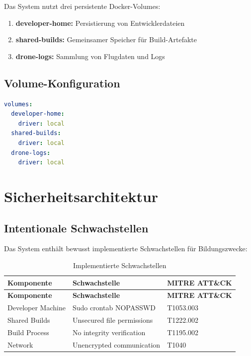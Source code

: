\documentclass[11pt,a4paper]{article}
\begin{document}
Das System nutzt drei persistente Docker-Volumes:

\begin{enumerate}
    \item \textbf{developer-home:} Persistierung von Entwicklerdateien
    \item \textbf{shared-builds:} Gemeinsamer Speicher für Build-Artefakte
    \item \textbf{drone-logs:} Sammlung von Flugdaten und Logs
\end{enumerate}

\subsection{Volume-Konfiguration}

\begin{lstlisting}[language=yaml, caption=Docker Compose Volume-Definition]
volumes:
  developer-home:
    driver: local
  shared-builds:
    driver: local
  drone-logs:
    driver: local
\end{lstlisting}

\section{Sicherheitsarchitektur}

\subsection{Intentionale Schwachstellen}

Das System enthält bewusst implementierte Schwachstellen für Bildungszwecke:

\begin{longtable}{|l|l|l|}
\caption{Implementierte Schwachstellen} \\
\hline
\textbf{Komponente} & \textbf{Schwachstelle} & \textbf{MITRE ATT\&CK} \\
\hline
\endfirsthead
\hline
\textbf{Komponente} & \textbf{Schwachstelle} & \textbf{MITRE ATT\&CK} \\
\hline
\endhead
\hline
\endfoot
\hline
\endlastfoot

Developer Machine & Sudo crontab NOPASSWD & T1053.003 \\
Shared Builds & Unsecured file permissions & T1222.002 \\
Build Process & No integrity verification & T1195.002 \\
Network & Unencrypted communication & T1040 \\
\end{longtable}
\end{document}
